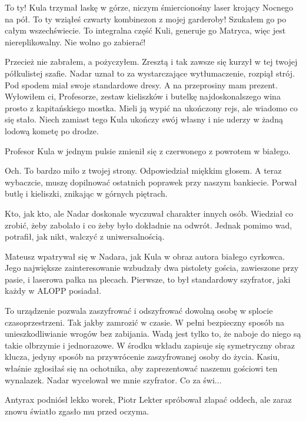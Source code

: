 \ds{} To ty! \dm{} Kula trzymał laskę w górze, niczym śmiercionośny laser krojący Nocnego na pół. \dm{} To ty wziąłeś czwarty kombinezon z mojej garderoby! Szukałem go po całym wszechświecie. To integralna część Kuli, generuje go Matryca, więc jest niereplikowalny. Nie wolno go zabierać! \de{}

\ds{} Przecież nie zabrałem, a pożyczyłem. Zresztą i tak zawsze się kurzył w tej twojej półkulistej szafie. \dm{}
Nadar uznał to za wystarczające wytłumaczenie, rozpiął strój. Pod spodem miał swoje standardowe dresy. \dm{} 
A na przeprosiny mam prezent. Wyłowiłem ci, Profesorze, zestaw kieliszków i butelkę najdoskonalszego wina prosto z kapitańskiego mostka.
Mieli ją wypić na ukończony rejs, ale wiadomo co się stało. Niech zamiast tego Kula ukończy swój własny i nie uderzy w żadną lodową kometę po drodze. \de{}

Profesor Kula w jednym pulsie zmienił się z czerwonego z powrotem w białego.

\ds{} Och. To bardzo miło z twojej strony. \dm{} Odpowiedział miękkim głosem. \dm{} A teraz wybaczcie, muszę dopilnować ostatnich poprawek przy naszym bankiecie. \dm{}
Porwał butlę i kieliszki, znikając w górnych piętrach.

Kto, jak kto, ale Nadar doskonale wyczuwał charakter innych osób.
Wiedział co zrobić, żeby zabolało i co żeby było dokładnie na odwrót.
Jednak pomimo wad, potrafił, jak nikt, walczyć z uniwersalnością.

Mateusz wpatrywał się w Nadara, jak Kula w obraz autora białego cyrkowca.
Jego największe zainteresowanie wzbudzały dwa pistolety gościa, zawieszone przy pasie, i laserowa pałka na plecach.
Pierwsze, to był standardowy szyfrator, jaki każdy w ALOPP posiadał.

\ds{} To urządzenie pozwala zaszyfrować i odszyfrować dowolną osobę w splocie czasoprzestrzeni.
Tak jakby zamrozić w czasie.
W pełni bezpieczny sposób na unieszkodliwianie wrogów bez zabijania.
Wadą jest tylko to, że naboje do niego są takie olbrzymie i jednorazowe.
W środku wkładu zapisuje się symetryczny obraz klucza, jedyny sposób na przywrócenie zaszyfrowanej osoby do życia.
Kasiu, właśnie zgłosiłaś się na ochotnika, aby zaprezentować naszemu gościowi ten wynalazek. \dm{} Nadar wycelował we mnie szyfrator. Co za świ...

\divider{}

Antyrax podniósł lekko worek, Piotr Lekter spróbował złapać oddech, ale zaraz znowu światło zgasło mu przed oczyma.

\divider{}

